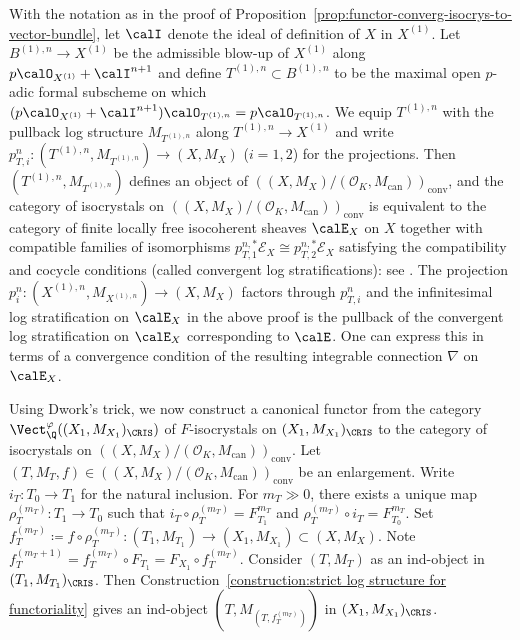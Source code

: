 \begin{rem}
With the notation as in the proof of Proposition~\ref{prop:functor-converg-isocrys-to-vector-bundle}, let $\calI$ denote the ideal of definition of $X$ in $X^{(1)}$. Let $B^{(1),n}\rightarrow X^{(1)}$ be the admissible blow-up of $X^{(1)}$ along $p\calO_{X^{(1)}}+\calI^{n+1}$ and define $T^{(1),n}\subset B^{(1),n}$ to be the maximal open $p$-adic formal subscheme on which $(p\calO_{X^{(1)}}+\calI^{n+1})\calO_{T^{(1),n}}=p\calO_{T^{(1),n}}$. We equip $T^{(1),n}$ with the pullback log structure $M_{T^{(1),n}}$ along $T^{(1),n}\rightarrow X^{(1)}$ and write $p_{T,i}^n\colon (T^{(1),n}, M_{T^{(1),n}}) \rightarrow (X, M_X)$ ($i = 1, 2$) for the projections.
Then $(T^{(1),n}, M_{T^{(1),n}})$ defines an object of $((X, M_X) / (\mathcal{O}_K, M_\mathrm{can}))_{\mathrm{conv}}$, and the category of isocrystals on $((X, M_X) / (\mathcal{O}_K, M_\mathrm{can}))_{\mathrm{conv}}$ is equivalent to the category of finite locally free isocoherent sheaves $\calE_X$ on $X$ together with compatible families of isomorphisms $p_{T,1}^{n,\ast} \mathcal{E}_X \cong p_{T,2}^{n,\ast} \mathcal{E}_X$ satisfying the compatibility and cocycle conditions (called convergent log stratifications): see \cite[pp.~626-631]{Shiho-I}.
The projection $p_{i}^n\colon (X^{(1),n}, M_{X^{(1),n}}) \rightarrow (X, M_X)$ factors
through $p_{T,i}^n$ and the infinitesimal log stratification on $\calE_X$ in the above proof is the pullback of the convergent log stratification on $\calE_X$ corresponding to $\calE$. One can express this in terms of a convergence condition of the resulting integrable connection $\nabla$ on $\calE_X$. 
\end{rem}

Using Dwork's trick, we now construct a canonical functor from the category 
$\Vect_\Q^\varphi((X_1,M_{X_1})_\CRIS)$ of $F$-isocrystals on $(X_1,M_{X_1})_\CRIS$ to the category of isocrystals on $((X, M_X) / (\mathcal{O}_K, M_\mathrm{can}))_{\mathrm{conv}}$. 
Let $(T, M_T, f) \in ((X, M_X) / (\mathcal{O}_K, M_\mathrm{can}))_{\mathrm{conv}}$ be an enlargement. Write $i_T\colon T_0 \rightarrow T_1$ for the natural inclusion. For $m_T \gg 0$, there exists a unique map $\rho_T^{(m_T)}\colon T_1 \rightarrow T_0$ such that $i_T \circ \rho_T^{(m_T)} = F_{T_1}^{m_T}$ and $\rho_T^{(m_T)} \circ i_T = F_{T_0}^{m_T}$. Set $f_T^{(m_T)} \coloneqq f \circ \rho_T^{(m_T)} \colon (T_1, M_{T_1}) \rightarrow (X_1, M_{X_1})\subset (X,M_X)$. Note $f_T^{(m_T+1)}=f_T^{(m_T)}\circ F_{T_1}=F_{X_1}\circ f_T^{(m_T)}$. Consider $(T, M_T)$ as an ind-object in $(T_1, M_{T_1})_{\CRIS}$. Then Construction~\ref{construction:strict log structure for functoriality} gives an ind-object $(T, M_{(T, f_T^{(m_T)})})$ in $(X_1,M_{X_1})_\CRIS$.


